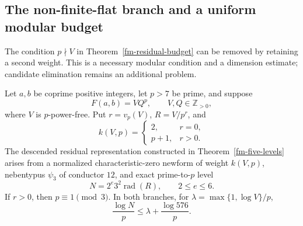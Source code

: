 \subsection{The non-finite-flat branch and a uniform modular budget}
\label{fm7-section}

The condition $p\nmid V$ in Theorem~\ref{fm-residual-budget} can be
removed by retaining a second weight. This is a necessary modular
condition and a dimension estimate; candidate elimination remains an
additional problem.

\begin{theorem}\label{fm7-weight-level}
Let $a,b$ be coprime positive integers, let $p>7$ be prime, and suppose
\[
 F(a,b)=VQ^p,\qquad V,Q\in\mathbb Z_{>0},
\]
where $V$ is $p$-power-free. Put $r=v_p(V)$, $R=V/p^r$, and
\begin{equation}\label{fm7-weight}
 k(V,p)=\begin{cases}2,&r=0,\\p+1,&r>0.\end{cases}
\end{equation}
The descended residual representation constructed in
Theorem~\ref{fm-five-levels} arises from a normalized characteristic-zero
newform of weight $k(V,p)$, nebentypus $\psi_3$ of conductor $12$, and
exact prime-to-$p$ level
\begin{equation}\label{fm7-level}
 N=2^e3^2\operatorname{rad}(R),\qquad 2\le e\le6.
\end{equation}
If $r>0$, then $p\equiv1\pmod3$. In both branches, for
$\lambda=\max\{1,\log V\}/p$,
\begin{equation}\label{fm7-level-height}
 \frac{\log N}{p}\le\lambda+\frac{\log576}{p}.
\end{equation}
\end{theorem}

